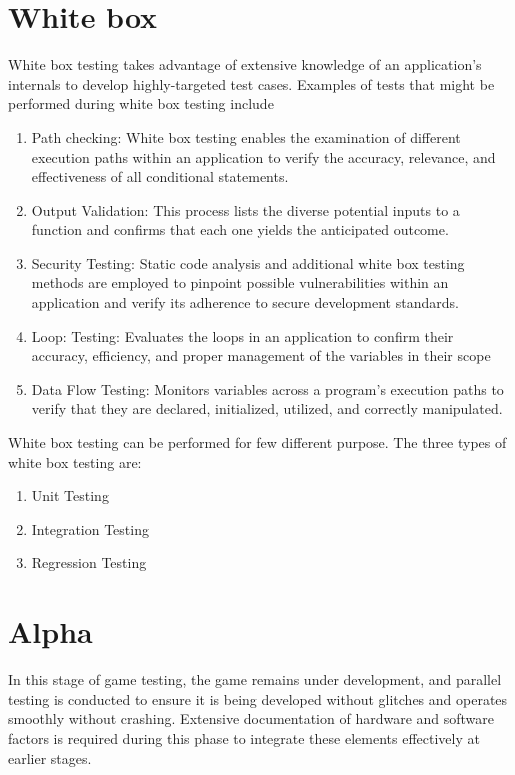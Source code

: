 \documentclass{article}
\begin{document}
\section{White box}
White box testing takes advantage of extensive knowledge of an application's internals to develop highly-targeted test cases. Examples of tests that might be performed during white box testing include

\begin{enumerate}
	\item Path checking: White box testing enables the examination of different execution paths within an application to verify the accuracy, relevance, and effectiveness of all conditional statements.
	\item Output Validation: This process lists the diverse potential inputs to a function and confirms that each one yields the anticipated outcome.
	\item Security Testing: Static code analysis and additional white box testing methods are employed to pinpoint possible vulnerabilities within an application and verify its adherence to secure development standards.
	\item Loop: Testing: Evaluates the loops in an application to confirm their accuracy, efficiency, and proper management of the variables in their scope 
	\item Data Flow Testing: Monitors variables across a program's execution paths to verify that they are declared, initialized, utilized, and correctly manipulated.
\end{enumerate}

White box testing can be performed for few different purpose. The three types of white box testing are:
\begin{enumerate}
	\item Unit Testing
	\item Integration Testing
	\item Regression Testing
\end{enumerate}

\section{Alpha}
In this stage of game testing, the game remains under development, and parallel testing is conducted to ensure it is being developed without glitches and operates smoothly without crashing. Extensive documentation of hardware and software factors is required during this phase to integrate these elements effectively at earlier stages.
\end{document}
